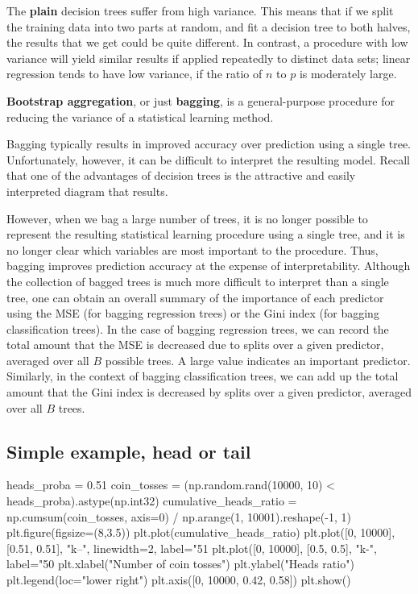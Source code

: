 \documentclass[%
oneside,                 %
final,                   %
10pt]{article}
\begin{document}
The \textbf{plain} decision trees suffer from high
variance. This means that if we split the training data into two parts
at random, and fit a decision tree to both halves, the results that we
get could be quite different. In contrast, a procedure with low
variance will yield similar results if applied repeatedly to distinct
data sets; linear regression tends to have low variance, if the ratio
of $n$ to $p$ is moderately large. 

\textbf{Bootstrap aggregation}, or just \textbf{bagging}, is a
general-purpose procedure for reducing the variance of a statistical
learning method. 


Bagging typically results in improved accuracy
over prediction using a single tree. Unfortunately, however, it can be
difficult to interpret the resulting model. Recall that one of the
advantages of decision trees is the attractive and easily interpreted
diagram that results.

However, when we bag a large number of trees, it is no longer
possible to represent the resulting statistical learning procedure
using a single tree, and it is no longer clear which variables are
most important to the procedure. Thus, bagging improves prediction
accuracy at the expense of interpretability.  Although the collection
of bagged trees is much more difficult to interpret than a single
tree, one can obtain an overall summary of the importance of each
predictor using the MSE (for bagging regression trees) or the Gini
index (for bagging classification trees). In the case of bagging
regression trees, we can record the total amount that the MSE is
decreased due to splits over a given predictor, averaged over all $B$ possible
trees. A large value indicates an important predictor. Similarly, in
the context of bagging classification trees, we can add up the total
amount that the Gini index  is decreased by splits over a given
predictor, averaged over all $B$ trees.

\subsection{Simple example, head or tail}
\bpycod
heads_proba = 0.51
coin_tosses = (np.random.rand(10000, 10) < heads_proba).astype(np.int32)
cumulative_heads_ratio = np.cumsum(coin_tosses, axis=0) / np.arange(1, 10001).reshape(-1, 1)
plt.figure(figsize=(8,3.5))
plt.plot(cumulative_heads_ratio)
plt.plot([0, 10000], [0.51, 0.51], "k--", linewidth=2, label="51%
plt.plot([0, 10000], [0.5, 0.5], "k-", label="50%
plt.xlabel("Number of coin tosses")
plt.ylabel("Heads ratio")
plt.legend(loc="lower right")
plt.axis([0, 10000, 0.42, 0.58])
plt.show()
\end{document}
